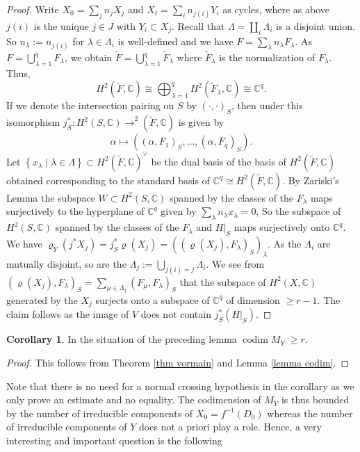 \documentclass[a4paper,11pt,final]{amsart}
\theoremstyle{plain}
\theoremstyle{definition}
\newtheorem{Cor}[subsection]{Corollary}
\numberwithin{equation}{section}
\theoremstyle{remark}
\begin{document}
\begin{proof}
Write $X_0=\sum_j n_j X_j$ and $X_t=\sum_i n_{j(i)} Y_i$ as cycles, where as above $j(i)$ is the unique $j\in J$ with $Y_i \subset X_j$. Recall that $\Lambda = \coprod_i \Lambda_i$ is a disjoint union. So $n_\lambda := n_{j(i)}$ for $\lambda \in \Lambda_i$
is well-defined and we have
$F = \sum_\lambda n_\lambda F_\lambda$.
As $F=\bigcup_{\lambda=1}^q F_\lambda$, we obtain ${{\widetilde{F}}}=\bigcup_{\lambda=1}^q {{\widetilde{F}}}_\lambda$ where ${{\widetilde{F}}}_\lambda$ is the normalization of $F_\lambda$. Thus,
\[
H^2({{\widetilde{{F}}}},{{\mathbb C}}){\cong} \bigoplus_{\lambda = 1}^q H^2({{\widetilde{{F}}}}_\lambda,{{\mathbb C}}){\cong} {{\mathbb C}}^q.
\]
If we denote the intersection pairing on $S$ by $(\cdot,\cdot)_S$, then under this isomorphism $j_S^*: H^2(S,{{\mathbb C}}) {\xrightarrow{\ \ }}^2({{\widetilde{{F}}}},{{\mathbb C}})$ is given by 
\[
\alpha \mapsto \left((\alpha, F_1)_S,\ldots, (\alpha, F_q)_S\right).
\]
Let $\left\{x_\lambda\mid \lambda \in \Lambda\right\}\subset H^2({{\widetilde{{F}}}},{{\mathbb C}})^\vee$ be the dual basis of the basis of $H^2({{\widetilde{{F}}}},{{\mathbb C}})$ obtained corresponding to the standard basis of ${{\mathbb C}}^q{\cong} H^2({{\widetilde{{F}}}},{{\mathbb C}})$. By Zariski's Lemma \cite[Ch III, Lem 8.2]{BPVH} the subspace $W\subset H^2(S,{{\mathbb C}})$ spanned by the classes of the $F_\lambda$ maps surjectively to the hyperplane of ${{\mathbb C}}^q$ given by $\sum_\lambda n_\lambda x_\lambda=0$, So the subspace of $H^2(S,{{\mathbb C}})$ spanned by the classes of the $F_\lambda$ and $H\vert_S$ maps surjectively onto ${{\mathbb C}}^q$. We have
${{\varrho}}_Y(j^*X_j)= j_S^*{{\varrho}}(X_j) = \left(\left({{\varrho}}(X_j), F_\lambda\right)_S\right)_\lambda.$
As the $\Lambda_i$ are mutually disjoint, so are the $\Lambda_j:= \bigcup_{j(i) = j} \Lambda_i$. We see from
$\left({{\varrho}}(X_j), F_\lambda\right)_S = \sum_{\mu \in \Lambda_j}(F_\mu, F_\lambda)_S$
that the subspace of $H^2(X,{{\mathbb C}})$ generated by the $X_j$ surjects onto a subspace of ${{\mathbb C}}^q$ of dimension $\geq r-1$. The claim follows as the image of $V$ does not contain $j_S^*(H\vert_S)$.
\end{proof}
\begin{Cor}\label{cor codim}
In the situation of the preceding lemma ${\operatorname{codim}} M_Y \; \geq r$.
\end{Cor}
\begin{proof} This follows from Theorem \ref{thm vormain} and Lemma \ref{lemma codim}.
\end{proof}
Note that there is no need for a normal crossing hypothesis in the corollary as we only prove an estimate and no equality. The codimension of $M_Y$ is thus bounded by the number of irreducible components of $X_0=f^{-1}(D_0)$ whereas the number of irreducible components of $Y$ does not a priori play a role. Hence, a very interesting and important question is the following
\end{document}
